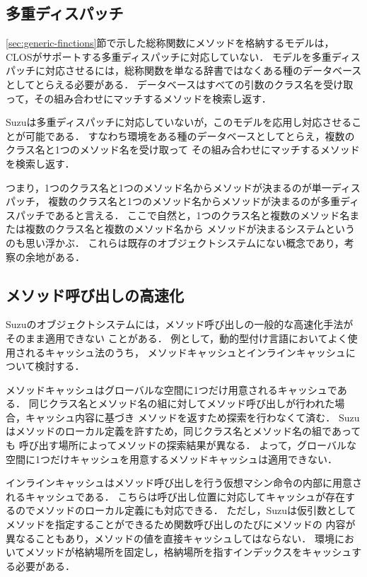 \documentclass{ipsjprosym}
\begin{document}
\subsection{多重ディスパッチ}
\label{sec:multiple-dispatch}

\ref{sec:generic-finctions}節で示した総称関数にメソッドを格納するモデルは，
CLOSがサポートする多重ディスパッチに対応していない．
モデルを多重ディスパッチに対応させるには，総称関数を単なる辞書ではなくある種のデータベース
としてとらえる必要がある．
データベースはすべての引数のクラス名を受け取って，その組み合わせにマッチするメソッドを検索し返す．

Suzuは多重ディスパッチに対応していないが，このモデルを応用し対応させることが可能である．
すなわち環境をある種のデータベースとしてとらえ，複数のクラス名と1つのメソッド名を受け取って
その組み合わせにマッチするメソッドを検索し返す．

つまり，1つのクラス名と1つのメソッド名からメソッドが決まるのが単一ディスパッチ，
複数のクラス名と1つのメソッド名からメソッドが決まるのが多重ディスパッチであると言える．
ここで自然と，1つのクラス名と複数のメソッド名または複数のクラス名と複数のメソッド名から
メソッドが決まるシステムというのも思い浮かぶ．
これらは既存のオブジェクトシステムにない概念であり，考察の余地がある．

\subsection{メソッド呼び出しの高速化}

Suzuのオブジェクトシステムには，メソッド呼び出しの一般的な高速化手法がそのまま適用できない
ことがある．
例として，動的型付け言語においてよく使用されるキャッシュ法\cite{Onodera:1997-04-15}のうち，
メソッドキャッシュとインラインキャッシュについて検討する．

メソッドキャッシュはグローバルな空間に1つだけ用意されるキャッシュである．
同じクラス名とメソッド名の組に対してメソッド呼び出しが行われた場合，キャッシュ内容に基づき
メソッドを返すため探索を行わなくて済む．
Suzuはメソッドのローカル定義を許すため，同じクラス名とメソッド名の組であっても
呼び出す場所によってメソッドの探索結果が異なる．
よって，グローバルな空間に1つだけキャッシュを用意するメソッドキャッシュは適用できない．

インラインキャッシュはメソッド呼び出しを行う仮想マシン命令の内部に用意されるキャッシュである．
こちらは呼び出し位置に対応してキャッシュが存在するのでメソッドのローカル定義にも対応できる．
ただし，Suzuは仮引数としてメソッドを指定することができるため関数呼び出しのたびにメソッドの
内容が異なることもあり，メソッドの値を直接キャッシュしてはならない．
環境においてメソッドが格納場所を固定し，格納場所を指すインデックスをキャッシュする必要がある．
\end{document}
